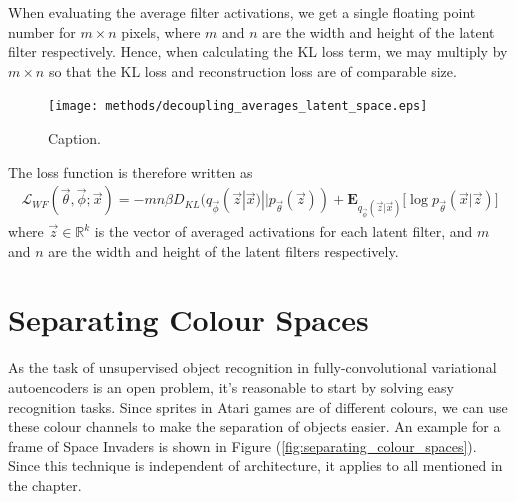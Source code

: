 When evaluating the average filter activations, we get a single floating point number for $m \times n$ pixels, where $m$ and $n$ are the width and height of the latent filter respectively. Hence, when calculating the KL loss term, we may multiply by $m \times n$ so that the KL loss and reconstruction loss are of comparable size.\\

\begin{figure}[H]
\centering
\captionsetup{justification=centering}
\texttt{[image: methods/decoupling\_averages\_latent\_space.eps]}
\caption{Caption.}
\label{fig:decoupling_averages_latent_space}
\end{figure}

The loss function is therefore written as 
\begin{align}
\mathcal{L}_{WF}(\vec{\theta}, \vec{\phi}; \vec{x}) = -mn\beta D_{KL}(q_{\vec{\phi}}(\vec{z}|\vec{x}) || p_{\vec{\theta}}(\vec{z})) + \mathbf{E}_{q_{\vec{\phi}}(\vec{z}|\vec{x})}\big[\log p_{\vec{\theta}}(\vec{x} | \vec{z}) \big]
\end{align}
where $\vec{z} \in \mathbb{R}^{k}$ is the vector of averaged activations for each latent filter, and $m$ and $n$ are the width and height of the latent filters respectively.



%
%
%
%
%
\section{Separating Colour Spaces}

As the task of unsupervised object recognition in fully-convolutional variational autoencoders is an open problem, it's reasonable to start by solving easy recognition tasks. Since sprites in Atari games are of different colours, we can use these colour channels to make the separation of objects easier. An example for a frame of Space Invaders is shown in Figure (\ref{fig:separating_colour_spaces}). Since this technique is independent of architecture, it applies to all mentioned in the chapter.


